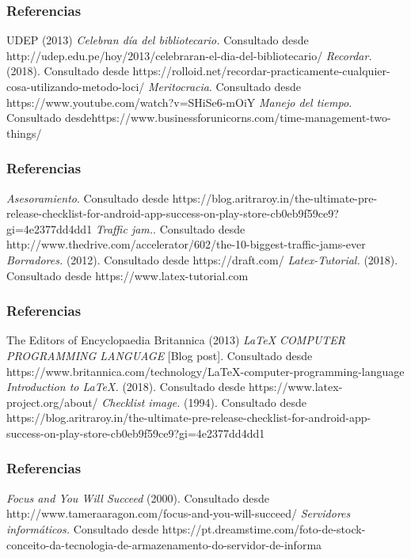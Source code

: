 \documentclass{beamer}
\begin{document}
\begin{frame}\frametitle{Referencias}
    \begin{thebibliography}{1}
        \bibitem{[9]} UDEP  (2013) \emph{Celebran d\'ia del bibliotecario.} Consultado desde http://udep.edu.pe/hoy/2013/celebraran-el-dia-del-bibliotecario/
        \bibitem{[10]} \emph{Recordar.} (2018). Consultado desde https://rolloid.net/recordar-practicamente-cualquier-cosa-utilizando-metodo-loci/
        \bibitem{[11]} \emph{Meritocracia}. Consultado desde https://www.youtube.com/watch?v=SHiSe6-mOiY
        \bibitem{[12]} \emph{Manejo del tiempo.}  Consultado desdehttps://www.businessforunicorns.com/time-management-two-things/    
    \end{thebibliography}
    \end{frame}

\begin{frame}\frametitle{Referencias}
    \begin{thebibliography}{1}
        \bibitem{[13]} \emph{Asesoramiento}. Consultado desde https://blog.aritraroy.in/the-ultimate-pre-release-checklist-for-android-app-success-on-play-store-cb0eb9f59ce9?gi=4e2377dd4dd1
        \bibitem{[14]} \emph{Traffic jam.}. Consultado desde http://www.thedrive.com/accelerator/602/the-10-biggest-traffic-jams-ever
        \bibitem{[15]} \emph{Borradores.} (2012). Consultado desde https://draft.com/
        \bibitem{[16]} \emph{Latex-Tutorial.} (2018). Consultado desde https://www.latex-tutorial.com        
    \end{thebibliography}
    \end{frame}
\begin{frame}\frametitle{Referencias}
    \begin{thebibliography}{1}
        \bibitem{[17]}The Editors of Encyclopaedia Britannica  (2013) \emph{LaTeX COMPUTER PROGRAMMING LANGUAGE} [Blog post]. Consultado desde https://www.britannica.com/technology/LaTeX-computer-programming-language
        \bibitem{[18]} \emph{Introduction to LaTeX.} (2018). Consultado desde https://www.latex-project.org/about/
        \bibitem{[19]} \emph{Checklist image.} (1994). Consultado desde https://blog.aritraroy.in/the-ultimate-pre-release-checklist-for-android-app-success-on-play-store-cb0eb9f59ce9?gi=4e2377dd4dd1
          
    \end{thebibliography}
    \end{frame}

    \begin{frame}\frametitle{Referencias}
    \begin{thebibliography}{1}
    \bibitem{[20]} \emph{Focus and You Will Succeed} (2000). Consultado desde  http://www.tameraaragon.com/focus-and-you-will-succeed/     
    \bibitem{[8]} \emph{Servidores inform\'aticos.} Consultado desde https://pt.dreamstime.com/foto-de-stock-conceito-da-tecnologia-de-armazenamento-do-servidor-de-informa%
    \end{thebibliography}
    \end{frame}
\end{document}
